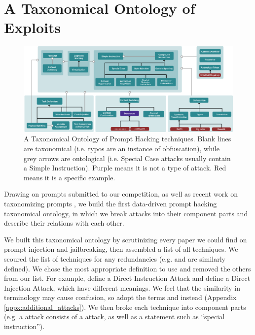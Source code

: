 
\section{A Taxonomical Ontology of Exploits}
\label{sec:ontology}
\begin{figure}[t]
    \centering
    \includegraphics[scale=0.15]{images/ontology.pdf}
    \caption{A Taxonomical Ontology of Prompt Hacking techniques. Blank lines are taxonomical (i.e. typos are an instance of obfuscation), while grey arrows are ontological (i.e. Special Case attacks usually contain a Simple Instruction). Purple means it is not a type of attack. Red means it is a specific example.}
    \label{fig:enter-label}
\end{figure}



Drawing on prompts submitted to our competition, as well as recent work on
taxonomizing prompts \cite{liu2023prompt,
  rao2023tricking, perez2022ignore, kang2023exploiting, greshake2023youve, Liu2023JailbreakingCV}, we build the first data-driven prompt hacking
taxonomical ontology, in which we break attacks into their component parts and describe their relations with each other. 

We built this taxonomical ontology by scrutinizing every paper we could find on prompt injection and jailbreaking, then assembled a list of all techniques. We scoured the list of techniques for any redundancies (e.g. \payload{} and \tokensmuggling{} are similarly defined). We chose the most appropriate definition to use and removed the others from our list. For example, \citet{rao2023tricking} define a Direct Instruction Attack and \citet{liu2023prompt} define a Direct Injection Attack, which have different meanings. We feel that the similarity in terminology may cause confusion, so adopt the terms \contextcontinuation{} and \contextignoring{} instead (Appendix \ref{appx:additional_attacks}). We then broke each technique into component parts (e.g. a \specialcase{} attack consists of a \direct{} attack, as well as a statement such as “special instruction”). 

